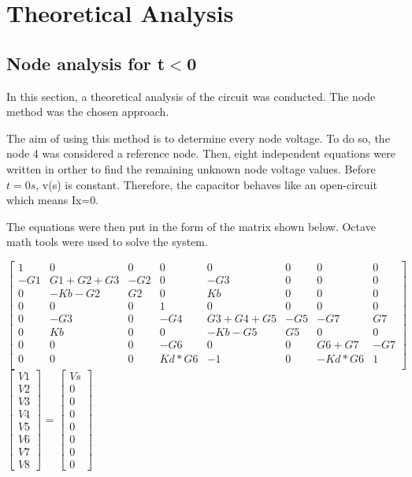 \section{Theoretical Analysis} \label{section:theo}


\subsection{Node analysis for t$<$0}

\par In this section, a theoretical analysis of the circuit was conducted. The node method was the chosen approach.

The aim of using this method is to determine every node voltage. To do so, the node 4 was considered a reference node. Then, eight independent equations were written in orther to find the remaining unknown node voltage values. Before $t=0s$, v(s) is constant. Therefore, the capacitor behaves like an open-circuit which means Ix=0.


The equations were then put in the form of the matrix shown below. Octave math tools were used to solve the system.



$\begin{bmatrix}
1 & 0 & 0 & 0 & 0 & 0 & 0 & 0\\
-G1 & G1+G2+G3 & -G2 & 0 & -G3 & 0 & 0 & 0\\
0 &-Kb-G2 & G2 & 0 & Kb & 0 & 0 & 0\\
0 & 0 & 0 & 1 & 0 & 0 & 0 & 0\\
0 & -G3 & 0 & -G4 & G3+G4+G5 & -G5 & -G7 & G7\\
0 & Kb & 0 & 0 & -Kb-G5 & G5 & 0 & 0\\
0 & 0 & 0 & -G6 & 0 & 0 & G6+G7 & -G7\\
0 & 0 & 0 & Kd*G6 & -1 & 0 & -Kd*G6 & 1\\
\end{bmatrix}
$$\begin{bmatrix}
V1 \\ V2 \\ V3 \\ V4 \\ V5 \\ V6 \\ V7 \\ V8
\end{bmatrix}$
=
$\begin{bmatrix}
Vs \\ 0 \\ 0 \\ 0 \\ 0 \\ 0 \\ 0 \\ 0
\end{bmatrix}
$


